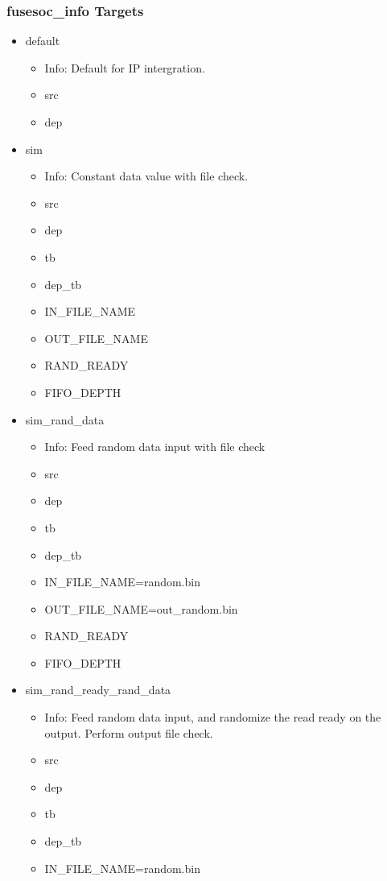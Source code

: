 \subsubsection{fusesoc\_info Targets}
\begin{itemize}
\item default
	\begin{itemize}
	\item[$\space$] Info: Default for IP intergration.
	\item src
	\item dep
	\end{itemize}
\item sim
	\begin{itemize}
	\item[$\space$] Info: Constant data value with file check.
	\item src
	\item dep
	\item tb
	\item dep\_tb
	\item IN\_FILE\_NAME
	\item OUT\_FILE\_NAME
	\item RAND\_READY
	\item FIFO\_DEPTH
	\end{itemize}
\item sim\_rand\_data
	\begin{itemize}
	\item[$\space$] Info: Feed random data input with file check
	\item src
	\item dep
	\item tb
	\item dep\_tb
	\item IN\_FILE\_NAME=random.bin
	\item OUT\_FILE\_NAME=out\_random.bin
	\item RAND\_READY
	\item FIFO\_DEPTH
	\end{itemize}
\item sim\_rand\_ready\_rand\_data
	\begin{itemize}
	\item[$\space$] Info: Feed random data input, and randomize the read ready on the output. Perform output file check.
	\item src
	\item dep
	\item tb
	\item dep\_tb
	\item IN\_FILE\_NAME=random.bin

\end{itemize}
\end{itemize}
